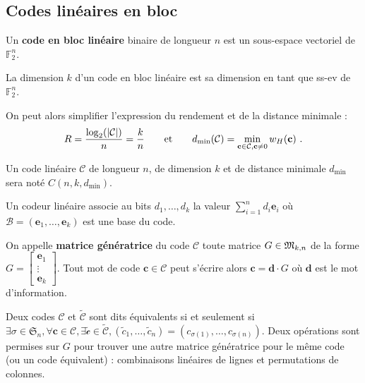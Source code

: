 \subsection{Codes linéaires en bloc}

	\begin{defn}
		Un \textbf{code en bloc linéaire} binaire de longueur $n$ est un sous-espace vectoriel de $\mathbb{F}_2^n$.
	\end{defn}

	\begin{defn}
		La dimension $k$ d'un code en bloc linéaire est sa dimension en tant que ss-ev de $\mathbb{F}_2^n$.
	\end{defn}

	On peut alors simplifier l'expression du rendement et de la distance minimale :
	$$R = \frac{\log_2(\left\lvert\mathcal{C}\right\rvert)}{n} = \frac{k}{n}
	\qquad \text{et} \qquad
	d_{\min}(\mathcal{C}) = \min_{\mathbf{c} \in \mathcal{C}, \mathbf{c} \neq 0} w_H(\mathbf{c})\ .$$

	\begin{note}
		Un code linéaire $\mathcal{C}$ de longueur $n$, de dimension $k$ et de distance minimale $d_{\min}$ sera noté $C(n,k,d_{\min})$.
	\end{note}

	\begin{defn}
		Un codeur linéaire associe au bits $d_1,\ldots,d_k$ la valeur $\sum_{i = 1}^n d_i \mathbf{e}_i$ où $\mathcal{B} = (\mathbf{e}_1,\ldots,\mathbf{e}_k)$ est une base du code.
	\end{defn}

	\begin{defn}
		On appelle \textbf{matrice génératrice} du code $\mathcal{C}$ toute matrice $G \in \mathfrak{M}_{k,n}$ de la forme
		$G = \begin{bmatrix}
			\mathbf{e}_1 \\ \vdots \\ \mathbf{e}_k
			\end{bmatrix}$.
		Tout mot de code $\mathbf{c} \in \mathcal{C}$ peut s'écrire alors $\mathbf{c} = \mathbf{d} \cdot G$ où $\mathbf{d}$ est le mot d'information.
	\end{defn}

	Deux codes $\mathcal{C}$ et $\mathcal{\tilde{C}}$ sont dits équivalents si et seulement si
	$\exists \sigma \in \mathfrak{S}_n,
		\forall \mathbf{c} \in \mathcal{C},
		\exists \mathcal{\tilde{c}} \in \mathcal{\tilde{C}},
		(\tilde{c}_1,\ldots,\tilde{c}_n) = (c_{\sigma(1)},\ldots,c_{\sigma(n)})$.
	Deux opérations sont permises sur $G$ pour trouver une autre matrice génératrice pour le même code (ou un code équivalent) : combinaisons linéaires de lignes et permutations de colonnes.

